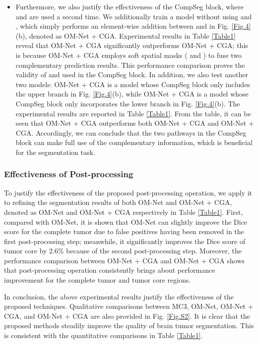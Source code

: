 \documentclass[journal,twoside]{IEEEtran}
\begin{document}
\begin{itemize}
\item Furthermore, we also justify the effectiveness of the CompSeg block, where  and  are used a second time. We additionally train a model without using  and , which simply performs an element-wise addition between  and  in Fig. \ref{Fig.4}(b), denoted as OM-Net + CGA.
Experimental results in Table \ref{Table1} reveal that OM-Net + CGA significantly outperforms OM-Net + CGA; this is because OM-Net + CGA employs soft spatial masks ( and ) to fuse two complementary prediction results. This performance comparison proves the validity of  and  used in the CompSeg block. In addition, we also test another two models: OM-Net + CGA is a model whose CompSeg block only includes the upper branch in Fig. \ref{Fig.4}(b), while OM-Net + CGA is a model whose CompSeg block only incorporates the lower branch in Fig. \ref{Fig.4}(b). The experimental results are reported in Table \ref{Table1}. From the table, it can be seen that OM-Net + CGA outperforms both OM-Net + CGA and OM-Net + CGA. Accordingly, we can conclude that the two pathways in the CompSeg block can make full use of the complementary information, which is beneficial for the segmentation task.
\end{itemize}






\subsubsection{Effectiveness of Post-processing}
To justify the effectiveness of the proposed post-processing operation, we apply it to refining the segmentation results of both OM-Net and OM-Net + CGA, denoted as OM-Net and OM-Net + CGA respectively in Table \ref{Table1}. First, compared with OM-Net, it is shown that OM-Net can slightly improve the Dice score for the complete tumor due to false positives having been removed in the first post-processing step; meanwhile, it significantly improves the Dice score of tumor core by 2.6\% because of the second post-processing step. Moreover, the performance comparison between OM-Net + CGA and OM-Net + CGA shows that post-processing operation consistently brings about performance improvement for the complete tumor and tumor core regions.



In conclusion, the above experimental results justify the effectiveness of the proposed techniques. Qualitative comparisons between MC3, OM-Net, OM-Net + CGA, and OM-Net + CGA are also provided in Fig. \ref{Fig.S2}. It is clear that the proposed methods steadily improve the quality of brain tumor segmentation. This is consistent with the quantitative comparisons in Table \ref{Table1}.
\end{document}

